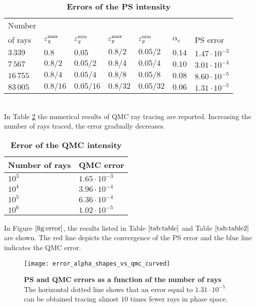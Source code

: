 \begin{table}[htbp] \label{tab:table}
\centering
\caption{\bf Errors of the PS intensity}
\begin{tabular}{lllllll}
 \hline  Number \\ of rays\;  & $\varepsilon^{\textrm{max}}_{\textit{q}} $  & $\varepsilon^{\textrm{min}}_{\textit{q}} $   \;     & $\varepsilon^{\textrm{max}}_{\textit{p}}$\;
  & $\varepsilon^{\textrm{min}}_{\textit{p}}$\; & $\alpha_\textrm{c}$  & PS error \\
  \hline 
 $3\,339$ & $0.8$  & $0.05$  & $0.8/2$  & $0.05/2$ & $0.14$ & $1.47\cdot10^{-3}$ \\
$7\,567$  & $0.8/2$  & $0.05/2$  & $0.8/4$  & $0.05/4$ & $0.10$ & $3.01\cdot 10^{-4}$  \\
$16\,755$  & $0.8/4$  & $0.05/4$  & $0.8/8$  & $0.05/8$ & $0.08$ & $8.60\cdot 10^{-5}$ \\
 $83\,005$ & $0.8/16$  & $0.05/16$  & $0.8/32$  & $0.05/32$ & $0.06$ & $1.31\cdot 10^{-5}$ \\
 \hline
 \end{tabular}
 \label{tab:table}
 \end{table}
\\ \indent In Table \ref{tab:table2} the numerical results of QMC ray tracing are reported.
Increasing the number of rays traced, the error gradually decreases.
\begin{table}[htbp]
\centering
\caption{\bf Error of the QMC intensity}
\begin{tabular}{ll} \hline   Number of rays\; & QMC error\\
 \hline $10^3$  & $1.65\cdot10^{-3}$ \\
$10^4$  & $3.96\cdot 10^{-4}$  \\
 $10^5$  & $6.36\cdot 10^{-4}$ \\ 
$10^6$  & $1.02\cdot 10^{-5}$ \\
 \hline
 \end{tabular}
 \label{tab:table2}
 \end{table}
\noindent In Figure $\ref{fig:error}$, the results listed in Table $\ref{tab:table}$ and Table $\ref{tab:table2}$ are shown. The red line depicts the convergence of the PS error and the blue line indicates the QMC error.
\begin{figure}[t]
  \begin{center}
  \texttt{[image: error\_alpha\_shapes\_vs\_qmc\_curved]}
  \end{center}
  \caption{\textbf{PS and QMC errors as a function of the number of rays}
  The horizontal dotted line shows that an error equal to $1.31\cdot  10^{-5}$ can be obtained tracing almost $10$ times fewer rays in phase space.}
  \label{fig:error}
\end{figure}
